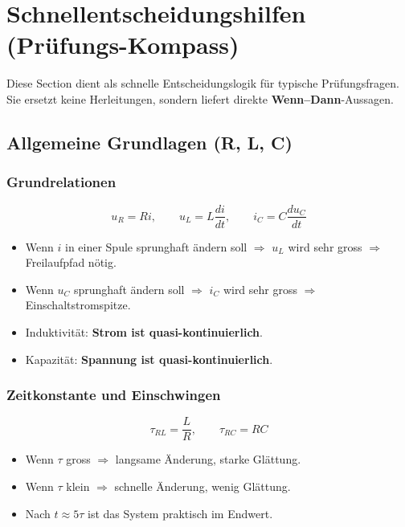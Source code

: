 \section{Schnellentscheidungshilfen (Prüfungs-Kompass)}

Diese Section dient als schnelle Entscheidungslogik für typische Prüfungsfragen.
Sie ersetzt keine Herleitungen, sondern liefert direkte \textbf{Wenn–Dann}-Aussagen.

\subsection{Allgemeine Grundlagen (R, L, C)}

\subsubsection{Grundrelationen}

\[
u_R = R i,\qquad u_L = L\frac{di}{dt},\qquad i_C = C\frac{du_C}{dt}
\]

\begin{itemize}
\item Wenn $i$ in einer Spule sprunghaft ändern soll $\Rightarrow$ $u_L$ wird sehr gross $\Rightarrow$ Freilaufpfad nötig.
\item Wenn $u_C$ sprunghaft ändern soll $\Rightarrow$ $i_C$ wird sehr gross $\Rightarrow$ Einschaltstromspitze.
\item Induktivität: \textbf{Strom ist quasi-kontinuierlich}.
\item Kapazität: \textbf{Spannung ist quasi-kontinuierlich}.
\end{itemize}

\subsubsection{Zeitkonstante und Einschwingen}

\[
\tau_{RL}=\frac{L}{R},\qquad \tau_{RC}=RC
\]

\begin{itemize}
\item Wenn $\tau$ gross $\Rightarrow$ langsame Änderung, starke Glättung.
\item Wenn $\tau$ klein $\Rightarrow$ schnelle Änderung, wenig Glättung.
\item Nach $t\approx 5\tau$ ist das System praktisch im Endwert.
\end{itemize}

